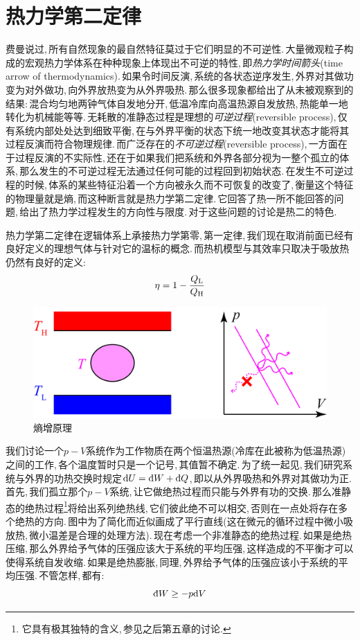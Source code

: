 \section{热力学第二定律}

费曼说过,\,所有自然现象的最自然特征莫过于它们明显的不可逆性.\,大量微观粒子构成的宏观热力学体系在种种现象上体现出不可逆的特性,\,即\emph{热力学时间箭头}(time arrow of thermodynamics).\,如果令时间反演,\,系统的各状态逆序发生,\,外界对其做功变为对外做功,\,向外界放热变为从外界吸热.\,那么很多现象都给出了从未被观察到的结果:\,混合均匀地两钟气体自发地分开,\,低温冷库向高温热源自发放热,\,热能单一地转化为机械能等等.\,无耗散的准静态过程是理想的\emph{可逆过程}(reversible process),\,仅有系统内部处处达到细致平衡,\,在与外界平衡的状态下统一地改变其状态才能将其过程反演而符合物理规律.\,而广泛存在的\emph{不可逆过程}(reversible process),\,一方面在于过程反演的不实际性,\,还在于如果我们把系统和外界各部分视为一整个孤立的体系,\,那么发生的不可逆过程无法通过任何可能的过程回到初始状态.\,在发生不可逆过程的时候,\,体系的某些特征沿着一个方向被永久而不可恢复的改变了,\,衡量这个特征的物理量就是熵,\,而这种断言就是热力学第二定律.\,它回答了热一所不能回答的问题,\,给出了热力学过程发生的方向性与限度.\,对于这些问题的讨论是热二的特色.

热力学第二定律在逻辑体系上承接热力学第零,\,第一定律,\,我们现在取消前面已经有良好定义的理想气体与针对它的温标的概念.\,而热机模型与其效率只取决于吸放热仍然有良好的定义:
\[\eta=1-\frac{Q_{\rm L}}{Q_{\rm H}}\]

\begin{figure}[H]
\centering
\includegraphics[width=15cm]{image/5-2-13.png}
\caption{熵增原理}\label{fig5-2-13}
\end{figure}
我们讨论一个$p-V$系统作为工作物质在两个恒温热源(冷库在此被称为低温热源)之间的工作,\,各个温度暂时只是一个记号,\,其值暂不确定.\,为了统一起见,\,我们研究系统与外界的功热交换时规定$\ud U=\dbar W+\dbar Q$,\,即以从外界吸热和外界对其做功为正.\,首先,\,我们孤立那个$p-V$系统,\,让它做绝热过程而只能与外界有功的交换.\,那么准静态的绝热过程\footnote{它具有极其独特的含义,\,参见之后第五章的讨论.}将给出系列绝热线,\,它们彼此绝不可以相交,\,否则在一点处将存在多个绝热的方向.\,图中为了简化而近似画成了平行直线(这在微元的循环过程中\ca 微小吸放热,\,微小温差\ca 是合理的处理方法).\,现在考虑一个非准静态的绝热过程.\,如果是绝热压缩,\,那么外界给予气体的压强应该大于系统的平均压强,\,这样造成的不平衡才可以使得系统自发收缩.\,如果是绝热膨胀,\,同理,\,外界给予气体的压强应该小于系统的平均压强.\,不管怎样,\,都有:
\[\dbar W \geq -p\ud V\]

